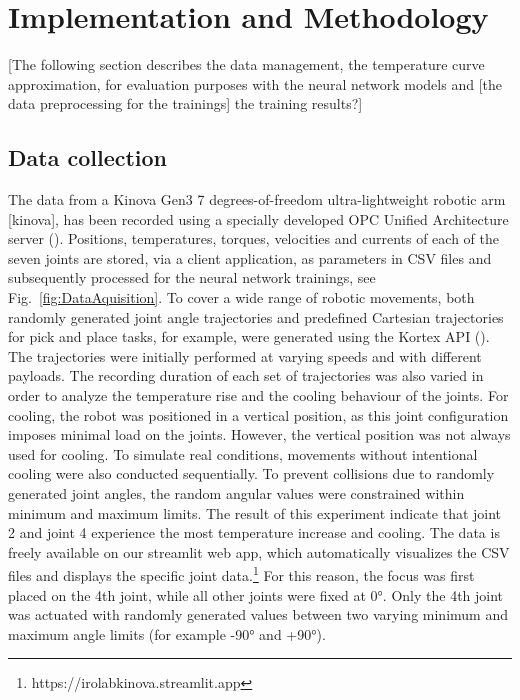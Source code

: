 \documentclass{ifacconf}
\begin{document}
\section{Implementation and Methodology}
[The following section describes the data management, the temperature curve approximation, for evaluation purposes with the neural network models 
and [the data preprocessing for the trainings] the training results?]

\subsection{Data collection}
The data from a Kinova Gen3 7 degrees-of-freedom ultra-lightweight robotic arm [kinova], has been recorded using a specially developed OPC Unified Architecture server (\cite{Girke}). 
Positions, temperatures, torques, velocities and currents of each of the seven joints are stored, via a client application, as parameters in CSV files and subsequently processed for the neural network trainings, see Fig.~\ref{fig:DataAquisition}.
To cover a wide range of robotic movements, both randomly generated joint angle trajectories and predefined Cartesian trajectories for pick and place tasks, for example, were generated using the Kortex API (\cite{kortexAPI}). 
The trajectories were initially performed at varying speeds and with different payloads. The recording duration of each set of trajectories was also varied in order to analyze the temperature rise and the cooling behaviour of the joints. 
For cooling, the robot was positioned in a vertical position, as this joint configuration imposes minimal load on the joints. However, the vertical position was not always used for cooling. To simulate real conditions, movements without intentional cooling were also conducted sequentially.
To prevent collisions due to randomly generated joint angles, the random angular values were constrained within minimum and maximum limits. 
The result of this experiment indicate that joint 2 and joint 4 experience the most temperature increase and cooling. The data is freely available on our streamlit web app, 
which automatically visualizes the CSV files and displays the specific joint data.\footnote{https://irolabkinova.streamlit.app}  
For this reason, the focus was first placed on the 4th joint, while all other joints were fixed at 0°. Only the 4th joint was actuated with randomly generated values between two varying minimum and maximum angle limits (for example -90° and +90°).
\end{document}

